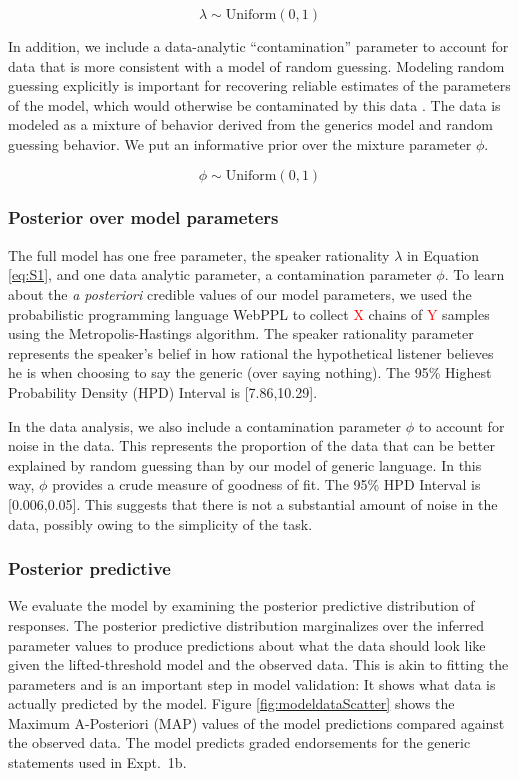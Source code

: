 \documentclass[10pt,letterpaper]{article}
\newcommand{\red}[1]{\textcolor{Red}{#1}}
\begin{document}
$$
\lambda \sim \text{Uniform}(0,1)
$$

In addition, we include a data-analytic ``contamination'' parameter to account for data that is more consistent with a model of random guessing. 
Modeling random guessing explicitly is important for recovering reliable estimates of the parameters of the model, which would otherwise be contaminated by this data \cite{LW2014}.
The data is modeled as a mixture of behavior derived from the generics model and random guessing behavior. 
We put an informative prior over the mixture parameter $\phi$.

$$
\phi \sim \text{Uniform}(0,1)
$$


\subsubsection{Posterior over model parameters}

The full model has one free parameter, the speaker rationality $\lambda$ in Equation \ref{eq:S1}, and one data analytic parameter, a contamination parameter $\phi$.
To learn about the \emph{a posteriori} credible values of our model parameters, we used the probabilistic programming language WebPPL \cite{dippl} to collect \red{X} chains of \red{Y} samples using the Metropolis-Hastings algorithm. 
The speaker rationality parameter represents the speaker's belief in how rational the hypothetical listener believes he is when choosing to say the generic (over saying nothing). 
The 95\% Highest Probability Density (HPD) Interval is [7.86,10.29].

In the data analysis, we also include a contamination parameter $\phi$ to account for noise in the data.  
This represents the proportion of the data that can be better explained by random guessing than by our model of generic language.
In this way, $\phi$ provides a crude measure of goodness of fit. 
The 95\% HPD Interval is [0.006,0.05]. 
This suggests that there is not a substantial amount of noise in the data, possibly owing to the simplicity of the task. 


\subsubsection{Posterior predictive}

We evaluate the model by examining the posterior predictive distribution of responses. The posterior predictive distribution marginalizes over the inferred parameter values to produce predictions about what the data should look like given the lifted-threshold model and the observed data. This is akin to fitting the parameters and is an important step in model validation: It shows what data is actually predicted by the model. 
Figure \ref{fig:modeldataScatter} shows the Maximum A-Posteriori (MAP) values of the model predictions compared against the observed data. 
The model predicts graded endorsements for the generic statements used in Expt.~1b. 
\end{document}
